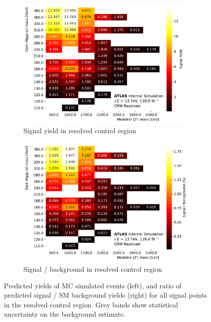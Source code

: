 \begin{figure}[htbp]
  \centering
  \begin{subfigure}{0.45\textwidth}
    \includegraphics[width=\textwidth]{Figures/5/SignalYields_CRW_Resolved.pdf}
    \caption{Signal yield in resolved \wjets control region}\label{fig:signal_yield_CRW_resolved_CR}
    \end{subfigure} \hspace{1em}
  \begin{subfigure}{0.45\textwidth}
    \includegraphics[width=\textwidth]{Figures/5/SignalContaminations_CRW_Resolved.pdf}
    \caption{Signal / background in resolved \wjets control region}\label{fig:signal_over_bkg_CRW_resolved_CR}
    \end{subfigure}
  \caption[Signal contaminations in merged SR and CRW]{Predicted yields of MC simulated events (left), and ratio of predicted signal / SM background yields (right) for all signal points in the resolved \wjets control region. Grey bands show statistical uncertainty on the background estimate.}
  \label{fig:signal_composition_CRW_resolved}
\end{figure}


